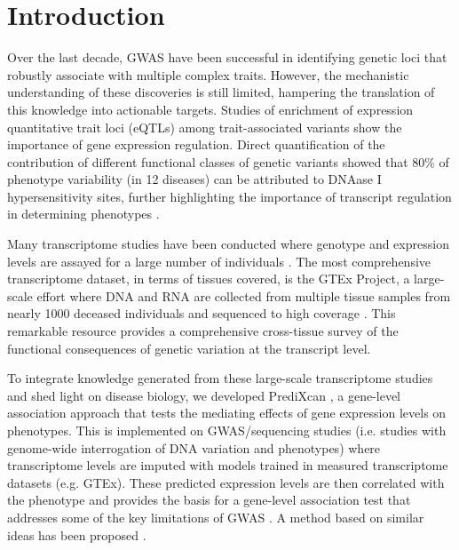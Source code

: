 \documentclass[10pt]{article}
\begin{document}



%
\section*{Introduction}
%
Over the last decade, GWAS have been successful in identifying genetic loci that robustly associate with multiple complex traits. However, the mechanistic understanding of these discoveries is still limited, hampering the translation of this knowledge into actionable targets. Studies of enrichment of expression quantitative trait loci (eQTLs) among trait-associated variants \cite{Nica2010,Nicolae2010} show the importance of gene expression regulation. Direct quantification of the contribution of different functional classes of genetic variants showed that 80\% of phenotype variability (in 12 diseases) can be attributed to DNAase I hypersensitivity sites, further highlighting the importance of transcript regulation in determining phenotypes \cite{Gusev2014}.

Many transcriptome studies have been conducted where genotype and expression levels are assayed for a large number of individuals \cite{Battle2014, Lappalainen2013, Zhang2015,Stranger2012}. The most comprehensive transcriptome dataset, in terms of tissues covered, is the GTEx Project, a large-scale effort where DNA and RNA are collected from multiple tissue samples from nearly 1000 deceased individuals  and sequenced to high coverage \cite{TheGTExConsortium2013}. This remarkable resource provides a comprehensive cross-tissue survey of the functional consequences of genetic variation at the transcript level.

 
To integrate knowledge generated from these large-scale transcriptome studies and shed light on disease biology, we developed PrediXcan \cite{Gamazon2015}, a gene-level association approach that tests the mediating effects of gene expression levels on phenotypes. This is implemented on GWAS/sequencing studies (i.e. studies with genome-wide interrogation of DNA variation and phenotypes) where transcriptome levels are imputed with models trained in measured transcriptome datasets (e.g. GTEx). These predicted expression levels are then correlated with the phenotype and provides the basis for a gene-level association test that addresses some of the key limitations of GWAS \cite{Gamazon2015}. A method based on similar ideas has been proposed \cite{Gusev2016}. 
\end{document}
